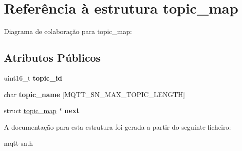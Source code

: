 \hypertarget{structtopic__map}{\section{Referência à estrutura topic\+\_\+map}
\label{structtopic__map}
}


Diagrama de colaboração para topic\+\_\+map\+:
\subsection*{Atributos Públicos}
\begin{DoxyCompactItemize}
\item 
\hypertarget{structtopic__map_a4a4a7efc3ca6d975a7f51dccc600aaef}{uint16\+\_\+t {\bfseries topic\+\_\+id}}\label{structtopic__map_a4a4a7efc3ca6d975a7f51dccc600aaef}

\item 
\hypertarget{structtopic__map_ab8ec626e28a2e37244900cc9f2776b83}{char {\bfseries topic\+\_\+name} \mbox{[}M\+Q\+T\+T\+\_\+\+S\+N\+\_\+\+M\+A\+X\+\_\+\+T\+O\+P\+I\+C\+\_\+\+L\+E\+N\+G\+T\+H\mbox{]}}\label{structtopic__map_ab8ec626e28a2e37244900cc9f2776b83}

\item 
\hypertarget{structtopic__map_a4aa4dcf69f63404cf1f280fa21e197c0}{struct \hyperlink{structtopic__map}{topic\+\_\+map} $\ast$ {\bfseries next}}\label{structtopic__map_a4aa4dcf69f63404cf1f280fa21e197c0}

\end{DoxyCompactItemize}


A documentação para esta estrutura foi gerada a partir do seguinte ficheiro\+:\begin{DoxyCompactItemize}
\item 
mqtt-\/sn.\+h\end{DoxyCompactItemize}
